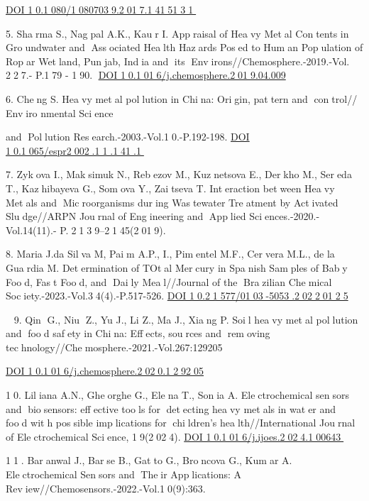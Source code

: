 {\href{https://doi.org/10.1080/10807039.2017.1415131}{DOI
10.1080/10807039.2017.1415131}

5. Sharma S., Nagpal A.K., Kaur I. Appraisal of Heavy Metal
Contents in Groundwater and Associated Health Hazards Posed to
Human Population of Ropar Wetland, Punjab, India and its
Environs//Chemosphere.-2019.-Vol. 227.- P.179 - 190.
\href{https://doi.org/10.1016/j.chemosphere.2019.04.009}{DOI
10.1016/j.chemosphere.2019.04.009}

6. Cheng S. Heavy metal pollution in China: Origin, pattern and
control// Enviro nmental Science

and Pollution Research.-2003.-Vol.10.-P.192-198.
\href{https://doi.org/10.1065/espr2002.11.141.1}{DOI
10.1065/espr2002.11.141.1}

7. Zykova I., Maksimuk N., Rebezov M., Kuznetsova E., Derkho M.,
Sereda T., Kazhibayeva G., Somova Y., Zaitseva T. Interaction
between Heavy Metals and Microorganisms during Wastewater
Treatment by Activated Sludge//ARPN Journal of Engineering and
Applied Sciences.-2020.-Vol.14(11).- P.2139--2145(2019).

8. Maria J.da Silva M, Paim A.P., I., Pimentel M.F., Cervera M.L.,
de la Guardia M. Determination of TOtal Mercury in Spanish Samples
of Baby Food, Fast Food, and Daily Meal//Journal of the
Brazilian Chemical Society.-2023.-Vol.34(4).-P.517-526.
\href{http://dx.doi.org/10.21577/0103-5053.20220125}{DOI
10.21577/0103-5053.20220125}

9. Qin G., Niu Z., Yu J., Li Z., Ma J., Xiang P. Soil heavy
metal pollution and food safety in China: Effects, sources and
removing technology//Chemosphere.-2021.-Vol.267:129205

\href{https://doi.org/10.1016/j.chemosphere.2020.129205}{DOI
10.1016/j.chemosphere.2020.129205}

10. Liliana A.N., Gheorghe G., Elena T., Sonia A. Electrochemical
sensors and biosensors: effective tools for detecting heavy
metals in water and food with possible implications for
children's health//International Journal of Electrochemical
Science, 19(2024).
\href{https://doi.org/10.1016/j.ijoes.2024.100643}{DOI
10.1016/j.ijoes.2024.100643}

11. Baranwal J., Barse B., Gatto G., Broncova G., Kumar A.
Electrochemical Sensors and Their Applications: A
Review//Chemosensors.-2022.-Vol.10(9):363.

}
